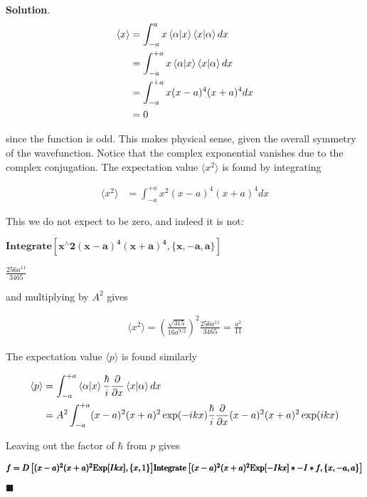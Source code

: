 \documentclass[12pt]{article}
\theoremstyle{definition}
\newenvironment{s}{%
        \begin{trivlist} \item \textbf{Solution}. }{%
            \hspace*{\fill} $\blacksquare$\end{trivlist}}%
\begin{document}
{\begin{s}
\begin{align*}
\langle x \rangle &= \int_{-a}^{a} x\bra{\alpha}\ket{x}\bra{x}\ket{\alpha}dx \\
&= \int_{-a}^{+a} x\bra{\alpha}\ket{x}\bra{x}\ket{\alpha}dx \\
&= \int_{-a}^{+a} x (x-a)^{4}(x+a)^{4}dx\\
&= 0
\end{align*}

since the function is odd. This makes physical sense, given the overall symmetry of the wavefunction. Notice that the complex exponential vanishes due to the complex conjugation. The expectation value $\langle x^{2}\rangle$ is found by integrating

\begin{align*}
\langle x^{2} \rangle &= \int_{-a}^{+a} x^{2} (x-a)^{4}(x+a)^{4}dx
\end{align*}

This we do not expect to be zero, and indeed it is not: 

\begin{doublespace}
\noindent\(\pmb{\text{Integrate}\left[x{}^{\wedge}2(x-a)^4 (x+a)^4 ,\{x,-a,a\}\right]}\)
\end{doublespace}

\begin{doublespace}
\noindent\(\frac{256 a^{11}}{3465}\)
\end{doublespace}

and multiplying by $A^{2}$ gives 

\begin{align*}
\langle x^{2} \rangle = \left(\frac{\sqrt{315}}{16 a^{9/2}}\right)^{2}\frac{256 a^{11}}{3465} = \frac{a^{2}}{11}
\end{align*}

The expectation value $\langle p\rangle$ is found similarly

\begin{align*}
\langle p \rangle &= \int_{-a}^{+a} \bra{\alpha}\ket{x}\frac{\hbar}{i}\frac{\partial}{\partial x}\bra{x}\ket{\alpha}dx\\
&= A^{2} \int_{-a}^{+a}(x-a)^{2}(x+a)^{2}\exp(-ikx)\frac{\hbar}{i}\frac{\partial}{\partial x}(x-a)^{2}(x+a)^{2}\exp(ikx)
\end{align*}

Leaving out the factor of $\hbar$ from $p$ gives 

\begin{doublespace}
\noindent\(\pmb{\text{}}\\
\pmb{f = D\left[(x-a)^2 (x+a)^2 \text{Exp}[I k x],\{x,1\}\right]}\\
\pmb{\text{Integrate}\left[(x-a)^2 (x+a)^2 \text{Exp}[-I k x]*-I *f,\{x,-a,a\}\right]}\)
\end{doublespace}


\end{s}}
\end{document}
